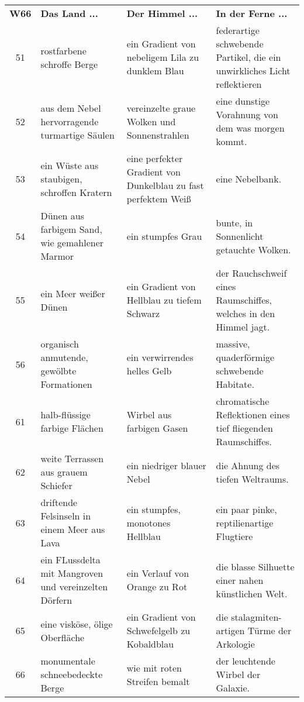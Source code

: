 \begin{tabularx}{\columnwidth}{cZZZ}
\textbf{W66} & \textbf{Das Land ...} & \textbf{Der Himmel ...} &
\textbf{In der Ferne ...} \\
51 & rostfarbene schroffe Berge & ein Gradient von nebeligem Lila zu
dunklem Blau
& federartige schwebende Partikel, die ein unwirkliches Licht reflektieren \\
52 & aus dem Nebel hervorragende turmartige Säulen & vereinzelte
graue Wolken und Sonnenstrahlen & eine dunstige Vorahnung von dem
was morgen kommt. \\
53 & ein Wüste aus staubigen, schroffen Kratern & eine perfekter
Gradient von Dunkelblau zu fast perfektem Weiß & eine Nebelbank. \\
54 & Dünen aus farbigem Sand, wie gemahlener Marmor & ein stumpfes
Grau &
bunte, in Sonnenlicht getauchte Wolken. \\
55 & ein Meer weißer Dünen & ein Gradient von Hellblau zu tiefem
Schwarz &
der Rauchschweif eines Raumschiffes, welches in den Himmel jagt. \\
56 & organisch anmutende, gewölbte Formationen & ein verwirrendes
helles Gelb &
massive, quaderförmige schwebende Habitate. \\
61 & halb-flüssige farbige Flächen & Wirbel aus farbigen Gasen &
chromatische Reflektionen eines tief fliegenden Raumschiffes. \\
62 & weite Terrassen aus grauem Schiefer & ein niedriger blauer
Nebel & die Ahnung des tiefen Weltraums. \\
63 & driftende Felsinseln in einem Meer aus Lava & ein stumpfes,
monotones Hellblau & ein paar pinke, reptilienartige Flugtiere \\
64 & ein FLussdelta mit Mangroven und vereinzelten Dörfern & ein
Verlauf von Orange zu Rot & die blasse Silhuette einer nahen
künstlichen Welt. \\
65 & eine visköse, ölige Oberfläche & ein Gradient von Schwefelgelb
zu Kobaldblau & die stalagmiten-artigen Türme der Arkologie \\
66 & monumentale schneebedeckte Berge & wie mit roten Streifen
bemalt &
der leuchtende Wirbel der Galaxie. \\
\end{tabularx}

